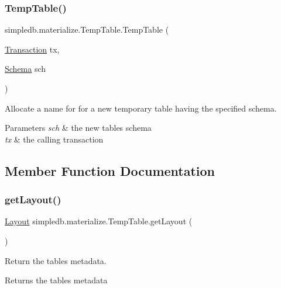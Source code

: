 \subsubsection{\texorpdfstring{Temp\+Table()}{TempTable()}}
{\footnotesize\ttfamily simpledb.\+materialize.\+Temp\+Table.\+Temp\+Table (\begin{DoxyParamCaption}\item[{\hyperlink{classsimpledb_1_1tx_1_1Transaction}{Transaction}}]{tx,  }\item[{\hyperlink{classsimpledb_1_1record_1_1Schema}{Schema}}]{sch }\end{DoxyParamCaption})\hspace{0.3cm}{\ttfamily [inline]}}

Allocate a name for for a new temporary table having the specified schema. 
\begin{DoxyParams}{Parameters}
{\em sch} & the new table\textquotesingle{}s schema \\
\hline
{\em tx} & the calling transaction \\
\hline
\end{DoxyParams}


\subsection{Member Function Documentation}
\mbox{\label{classsimpledb_1_1materialize_1_1TempTable_abf17e522f52e49657f10db1156e05c46}} 
\subsubsection{\texorpdfstring{get\+Layout()}{getLayout()}}
{\footnotesize\ttfamily \hyperlink{classsimpledb_1_1record_1_1Layout}{Layout} simpledb.\+materialize.\+Temp\+Table.\+get\+Layout (\begin{DoxyParamCaption}{ }\end{DoxyParamCaption})\hspace{0.3cm}{\ttfamily [inline]}}

Return the table\textquotesingle{}s metadata. \begin{DoxyReturn}{Returns}
the table\textquotesingle{}s metadata 
\end{DoxyReturn}
\mbox{\label{classsimpledb_1_1materialize_1_1TempTable_adcf144ac73b859736c7d2f71fb42e22e}} 
